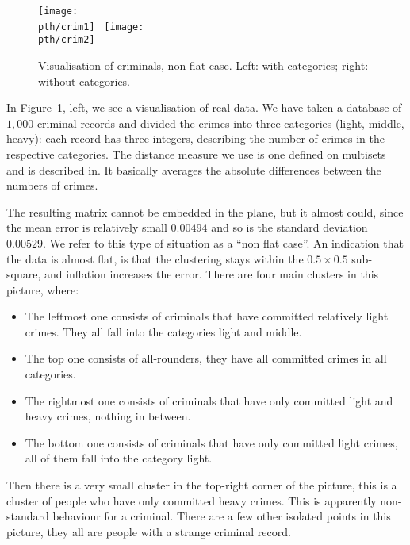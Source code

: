 \documentclass{article}
\theoremstyle{definition}
\begin{document}
\begin{figure}[!ht]
\begin{center}
\texttt{[image: \\pth/crim1]}
\ \texttt{[image: \\pth/crim2]}
\caption{Visualisation of criminals, non flat case.
Left: with categories; right: without categories.}
\label{to:fig:cluscrimcat}
\end{center}
\end{figure}

In Figure~\ref{to:fig:cluscrimcat}, left, we see a visualisation of real data. We
have taken a database of $1,\!000$ criminal records  and divided the crimes into three categories
(light, middle, heavy): each record has three integers, describing the number
of crimes in the respective categories. The distance measure we use is one
defined on multisets and is described 
in. It basically averages the
absolute differences between the numbers of crimes.

The resulting matrix cannot be embedded in the plane, but it almost could,
since the mean error is relatively small $0.00494$ and so is the standard
deviation $0.00529$. We refer to this type of situation as a ``non flat
case''. An indication that the data is almost flat, is that the clustering
stays within the $0.5 \times 0.5$ sub-square, and inflation increases the
error. There are four main clusters in this picture, where:
\begin{itemize}
\item The leftmost one consists of criminals that have committed relatively
      light crimes. They all fall into the categories light and middle.
\item The top one consists of all-rounders, they have all committed crimes
      in all categories.
\item The rightmost one consists of criminals that have only committed
      light and heavy crimes, nothing in between.
\item The bottom one consists of criminals that have only committed light
      crimes, all of them fall into the category light.
\end{itemize}
Then there is a very small cluster in the top-right corner of the picture, this
is a cluster of people who have only committed heavy crimes. This is apparently
non-standard behaviour for a criminal. There are a few other isolated points in
this picture, they all are people with a strange criminal record.
\end{document}
